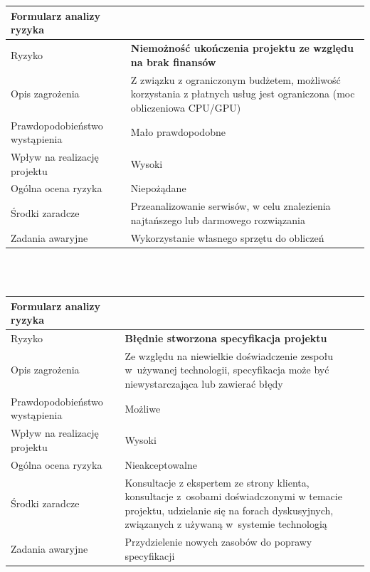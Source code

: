 \documentclass{article}
\begin{document}
\mbox{}\\\mbox{}\\

{\def\arraystretch{1.3}\tabcolsep=10pt
\begin{tabular}{|L{6cm}|L{9cm}|}
\hline
Formularz analizy ryzyka &  \\
\hline
Ryzyko 						   & \textbf{Niemożność ukończenia projektu ze względu na brak finansów} \\
\hline
Opis zagrożenia				   & Z związku z ograniczonym budżetem, możliwość korzystania z płatnych usług jest ograniczona (moc obliczeniowa CPU/GPU) \\
\hline
Prawdopodobieństwo wystąpienia & Mało prawdopodobne \\
\hline
Wpływ na realizację projektu   & Wysoki \\
\hline
Ogólna ocena ryzyka   & Niepożądane \\
\hline
Środki zaradcze				   & Przeanalizowanie serwisów, w celu znalezienia najtańszego lub darmowego rozwiązania \\
\hline
Zadania awaryjne			   & Wykorzystanie własnego sprzętu do obliczeń \\
\hline
\end{tabular}}

\mbox{}\\\mbox{}\\

{\def\arraystretch{1.3}\tabcolsep=10pt
\begin{tabular}{|L{6cm}|L{9cm}|}
\hline
Formularz analizy ryzyka &  \\
\hline
Ryzyko 						   & \textbf{Błędnie stworzona specyfikacja projektu} \\
\hline
Opis zagrożenia				   & Ze względu na niewielkie doświadczenie zespołu w~używanej technologii, specyfikacja może być niewystarczająca lub zawierać błędy \\
\hline
Prawdopodobieństwo wystąpienia & Możliwe \\
\hline
Wpływ na realizację projektu   & Wysoki \\
\hline
Ogólna ocena ryzyka   & Nieakceptowalne \\
\hline
Środki zaradcze				   & Konsultacje z ekspertem ze strony klienta, konsultacje z~osobami doświadczonymi w temacie projektu, udzielanie się na forach dyskusyjnych, związanych z używaną w~systemie technologią \\
\hline
Zadania awaryjne			   & Przydzielenie nowych zasobów do poprawy specyfikacji \\
\hline
\end{tabular}}
\end{document}
